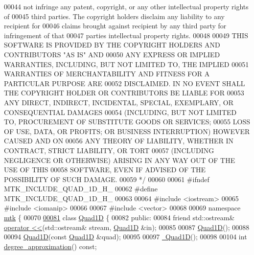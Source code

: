\begin{DoxyCode}
00044 \textcolor{comment}{not infringe any patent, copyright, or any other intellectual property rights of}
00045 \textcolor{comment}{third parties. The copyright holders disclaim any liability to any recipient for}
00046 \textcolor{comment}{claims brought against recipient by any third party for infringement of that}
00047 \textcolor{comment}{parties intellectual property rights.}
00048 \textcolor{comment}{}
00049 \textcolor{comment}{THIS SOFTWARE IS PROVIDED BY THE COPYRIGHT HOLDERS AND CONTRIBUTORS "AS IS" AND}
00050 \textcolor{comment}{ANY EXPRESS OR IMPLIED WARRANTIES, INCLUDING, BUT NOT LIMITED TO, THE IMPLIED}
00051 \textcolor{comment}{WARRANTIES OF MERCHANTABILITY AND FITNESS FOR A PARTICULAR PURPOSE ARE}
00052 \textcolor{comment}{DISCLAIMED. IN NO EVENT SHALL THE COPYRIGHT HOLDER OR CONTRIBUTORS BE LIABLE FOR}
00053 \textcolor{comment}{ANY DIRECT, INDIRECT, INCIDENTAL, SPECIAL, EXEMPLARY, OR CONSEQUENTIAL DAMAGES}
00054 \textcolor{comment}{(INCLUDING, BUT NOT LIMITED TO, PROCUREMENT OF SUBSTITUTE GOODS OR SERVICES;}
00055 \textcolor{comment}{LOSS OF USE, DATA, OR PROFITS; OR BUSINESS INTERRUPTION) HOWEVER CAUSED AND ON}
00056 \textcolor{comment}{ANY THEORY OF LIABILITY, WHETHER IN CONTRACT, STRICT LIABILITY, OR TORT}
00057 \textcolor{comment}{(INCLUDING NEGLIGENCE OR OTHERWISE) ARISING IN ANY WAY OUT OF THE USE OF THIS}
00058 \textcolor{comment}{SOFTWARE, EVEN IF ADVISED OF THE POSSIBILITY OF SUCH DAMAGE.}
00059 \textcolor{comment}{*/}
00060 
00061 \textcolor{preprocessor}{#ifndef MTK\_INCLUDE\_QUAD\_1D\_H\_}
00062 \textcolor{preprocessor}{#define MTK\_INCLUDE\_QUAD\_1D\_H\_}
00063 
00064 \textcolor{preprocessor}{#include <iostream>}
00065 \textcolor{preprocessor}{#include <iomanip>}
00066 
00067 \textcolor{preprocessor}{#include <vector>}
00068 
00069 \textcolor{keyword}{namespace }\hyperlink{namespacemtk}{mtk} \{
00070 
\hypertarget{mtk__quad__1d_8h_source_l00081}{}\hyperlink{classmtk_1_1Quad1D}{00081} \textcolor{keyword}{class }\hyperlink{classmtk_1_1Quad1D}{Quad1D} \{
00082  \textcolor{keyword}{public}:
00084   \textcolor{keyword}{friend} std::ostream& \hyperlink{classmtk_1_1Quad1D_af1194665f127e323852f778c8c0d4f95}{operator <<}(std::ostream& stream, \hyperlink{classmtk_1_1Quad1D}{Quad1D} &in);
00085 
00087   \hyperlink{classmtk_1_1Quad1D_ada5a2f1e7c92dbf1f85c61ecd0d173ec}{Quad1D}();
00088 
00094   \hyperlink{classmtk_1_1Quad1D_ada5a2f1e7c92dbf1f85c61ecd0d173ec}{Quad1D}(\textcolor{keyword}{const} \hyperlink{classmtk_1_1Quad1D}{Quad1D} &quad);
00095 
00097   \hyperlink{classmtk_1_1Quad1D_ae3de223d0841c9602feb4ea8b305a373}{~Quad1D}();
00098 
00104   \textcolor{keywordtype}{int} \hyperlink{classmtk_1_1Quad1D_aa1d1fe5f7cdaf8bf923a11c7d3d2468f}{degree\_approximation}() \textcolor{keyword}{const};

\end{DoxyCode}
